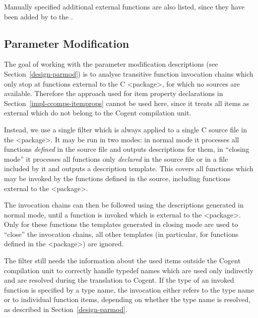 Manually specified additional external functions are also listed, since they have been added by 
to the .

\subsection{Parameter Modification}
\label{impl-ccomps-parmod}

The goal of working with the parameter modification descriptions (see Section~\ref{design-parmod}) is to analyse 
transitive function invocation chains which only stop at functions external to the C <package>, for which no sources
are available. Therefore the approach used for item property declarations in Section~\ref{impl-ccomps-itemprops}
cannot be used here, since it treats all items as external which do not belong to the Cogent compilation unit.

Instead, we use a single filter  which is always applied to a single C source file in the 
<package>. It may be run in two modes: in normal mode it processes all functions \textit{defined} in the source
file and outputs descriptions for them, in ``closing mode'' it processes all functions only \textit{declared} in 
the source file or in a file included by it and outputs a description template. This covers all functions which 
may be invoked by the functions defined in the source, including functions external to the <package>. 

The invocation chains can then be followed using the descriptions generated in normal mode, until a function is invoked
which is external to the <package>. Only for these functions the templates generated in closing mode are used
to ``close'' the invocation chains, all other templates (in particular, for functions defined in the <package>)
are ignored.

The filter still needs the information about the used items outside the Cogent compilation unit to correctly handle
typedef names which are used only indirectly and are resolved during the translation to Cogent. If the type of an
invoked function is specified by a type name, the invocation either refers to the type name or to individual function items,
depending on whether the type name is resolved, as described in Section~\ref{design-parmod}.

\subsubsection{}

